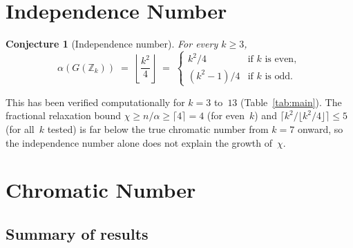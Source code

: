 \documentclass[12pt]{article}
\newtheorem{conjecture}[theorem]{Conjecture}
\theoremstyle{definition}
\theoremstyle{remark}
\newcommand{\Z}{\mathbb{Z}}
\newcommand{\GZk}{G(\Z_k)}
\begin{document}
\section{Independence Number}
\label{sec:indep}

\begin{conjecture}[Independence number]
\label{conj:alpha}
For every $k \ge 3$,
\[
  \alpha(\GZk) \;=\; \left\lfloor \frac{k^2}{4} \right\rfloor
  \;=\;
  \begin{cases}
    k^2/4       & \text{if } k \text{ is even},\\
    (k^2 - 1)/4 & \text{if } k \text{ is odd}.
  \end{cases}
\]
\end{conjecture}

This has been verified computationally for $k = 3$ to~$13$
(Table~\ref{tab:main}).  The fractional relaxation bound
$\chi \ge n/\alpha \ge \lceil 4 \rceil = 4$ (for even~$k$) and
$\lceil k^2 / \lfloor k^2/4 \rfloor \rceil \le 5$ (for all~$k$ tested)
is far below the true chromatic number from $k = 7$ onward, so the
independence number alone does not explain the growth of~$\chi$.


\section{Chromatic Number}
\label{sec:chromatic}

\subsection{Summary of results}
\end{document}
